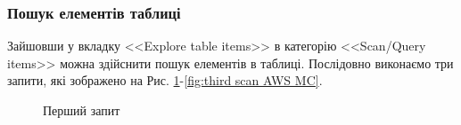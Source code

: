 \documentclass[a4paper,14pt]{extarticle} %
\begin{document}
\subsubsection*{Пошук елементів таблиці}

Зайшовши у вкладку <<Explore table items>> в категорію <<Scan/Query items>> мож\-на здійснити пошук елементів 
в таблиці. Послідовно виконаємо три запити, які зоб\-ражено на Рис. \ref{fig:first scan AWS MC}-\ref{fig:third scan AWS MC}.

\begin{figure}[H]
    \begin{minipage}[H]{1\linewidth}
    \end{minipage}
    \vfill
    \begin{minipage}[H]{1\linewidth}
        \vspace{0.5cm}
        \caption{Перший запит}
        \label{fig:first scan AWS MC}
    \end{minipage}
\end{figure}

\begin{figure}[H]
\end{figure}
\end{document}
